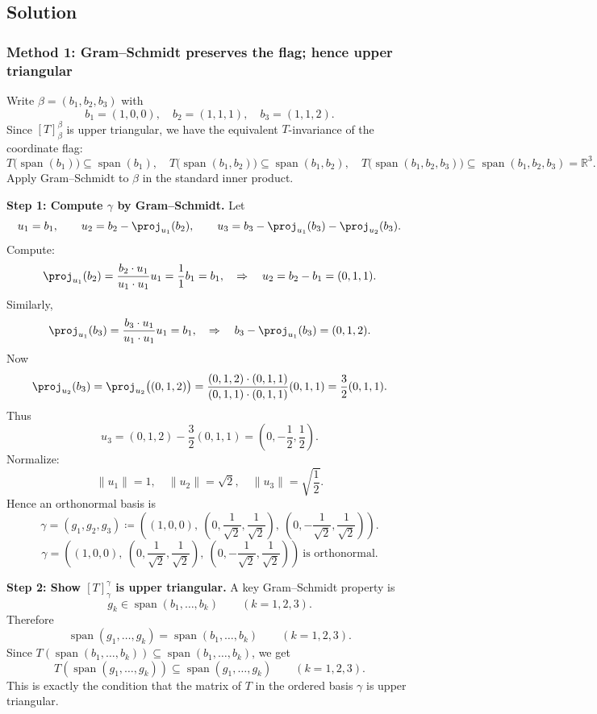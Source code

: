 \documentclass[12pt]{article}
\newcommand{\df}{\coloneqq}
\newcommand{\R}{\mathbb{R}}
\DeclareMathOperator{\Span}{span}
\begin{document}
\subsection{Solution}

\subsubsection{Method 1: Gram--Schmidt preserves the flag; hence upper triangular}
Write $\beta=(b_1,b_2,b_3)$ with
\[
b_1=(1,0,0),\quad b_2=(1,1,1),\quad b_3=(1,1,2).
\]
Since $[T]_{\beta}^{\beta}$ is upper triangular, we have the equivalent $T$-invariance of the coordinate flag:
\[
T\bigl(\Span(b_1)\bigr)\subseteq \Span(b_1),\quad
T\bigl(\Span(b_1,b_2)\bigr)\subseteq \Span(b_1,b_2),\quad
T\bigl(\Span(b_1,b_2,b_3)\bigr)\subseteq \Span(b_1,b_2,b_3)=\R^3.
\]
Apply Gram--Schmidt to $\beta$ in the standard inner product.

\medskip
\noindent\textbf{Step 1: Compute $\gamma$ by Gram--Schmidt.}
Let
\[
u_1=b_1,\qquad
u_2=b_2-\proj_{u_1}(b_2),\qquad
u_3=b_3-\proj_{u_1}(b_3)-\proj_{u_2}(b_3).
\]
Compute:
\[
\proj_{u_1}(b_2)=\frac{b_2\cdot u_1}{u_1\cdot u_1}u_1=\frac{1}{1}b_1=b_1,
\quad\Rightarrow\quad u_2=b_2-b_1=(0,1,1).
\]
Similarly,
\[
\proj_{u_1}(b_3)=\frac{b_3\cdot u_1}{u_1\cdot u_1}u_1=b_1,
\quad\Rightarrow\quad b_3-\proj_{u_1}(b_3)=(0,1,2).
\]
Now
\[
\proj_{u_2}(b_3)=\proj_{u_2}\bigl((0,1,2)\bigr)
=\frac{(0,1,2)\cdot (0,1,1)}{(0,1,1)\cdot(0,1,1)}(0,1,1)
=\frac{3}{2}(0,1,1).
\]
Thus
\[
u_3=(0,1,2)-\frac{3}{2}(0,1,1)=\left(0,-\frac12,\frac12\right).
\]
Normalize:
\[
\|u_1\|=1,\quad \|u_2\|=\sqrt2,\quad \|u_3\|=\sqrt{\frac12}.
\]
Hence an orthonormal basis is
\[
\gamma=(g_1,g_2,g_3)\df
\left(
(1,0,0),\ \left(0,\frac{1}{\sqrt2},\frac{1}{\sqrt2}\right),\ \left(0,-\frac{1}{\sqrt2},\frac{1}{\sqrt2}\right)
\right).
\]
\[
\boxed{\,
\gamma=\left(
(1,0,0),\ \left(0,\frac{1}{\sqrt2},\frac{1}{\sqrt2}\right),\ \left(0,-\frac{1}{\sqrt2},\frac{1}{\sqrt2}\right)
\right)\ \text{is orthonormal.}
\,}
\]

\medskip
\noindent\textbf{Step 2: Show $[T]_\gamma^\gamma$ is upper triangular.}
A key Gram--Schmidt property is
\[
g_k\in \Span(b_1,\dots,b_k)\qquad (k=1,2,3).
\]
Therefore
\[
\Span(g_1,\dots,g_k)=\Span(b_1,\dots,b_k)\qquad (k=1,2,3).
\]
Since $T(\Span(b_1,\dots,b_k))\subseteq \Span(b_1,\dots,b_k)$, we get
\[
T(\Span(g_1,\dots,g_k))\subseteq \Span(g_1,\dots,g_k)\qquad (k=1,2,3).
\]
This is exactly the condition that the matrix of $T$ in the ordered basis $\gamma$ is upper triangular.
\end{document}

